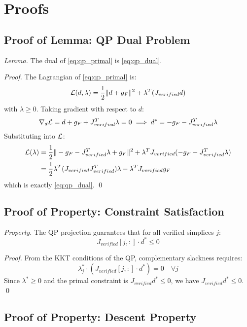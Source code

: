 \appendix
\section{Proofs}

\subsection{Proof of Lemma: QP Dual Problem}

\textit{Lemma.} The dual of \eqref{eq:qp_primal} is \eqref{eq:qp_dual}.

\textit{Proof.} The Lagrangian of \eqref{eq:qp_primal} is:
\begin{equation}
    \mathcal{L}(d, \lambda) = \frac{1}{2} \|d + g_F\|^2 + \lambda^T (J_{verified} d)
\end{equation}
with $\lambda \geq 0$. Taking gradient with respect to $d$:
\begin{equation}
    \nabla_d \mathcal{L} = d + g_F + J_{verified}^T \lambda = 0 \implies d^* = -g_F - J_{verified}^T \lambda
\end{equation}
Substituting into $\mathcal{L}$:
\begin{align}
    \mathcal{L}(\lambda) &= \frac{1}{2} \| -g_F - J_{verified}^T \lambda + g_F \|^2 + \lambda^T J_{verified}(-g_F - J_{verified}^T \lambda) \\
    &= \frac{1}{2} \lambda^T (J_{verified} J_{verified}^T) \lambda - \lambda^T J_{verified} g_F
\end{align}
which is exactly \eqref{eq:qp_dual}. \qed

\subsection{Proof of Property: Constraint Satisfaction}

\textit{Property.} The QP projection guarantees that for all verified simplices $j$:
\begin{equation}
    J_{verified}[j,:] \cdot d^* \leq 0
\end{equation}

\textit{Proof.} From the KKT conditions of the QP, complementary slackness requires:
\begin{equation}
    \lambda^*_j \cdot (J_{verified}[j,:] \cdot d^*) = 0 \quad \forall j
\end{equation}
Since $\lambda^* \geq 0$ and the primal constraint is $J_{verified} d^* \leq 0$, we have $J_{verified} d^* \leq 0$. \qed

\subsection{Proof of Property: Descent Property}

